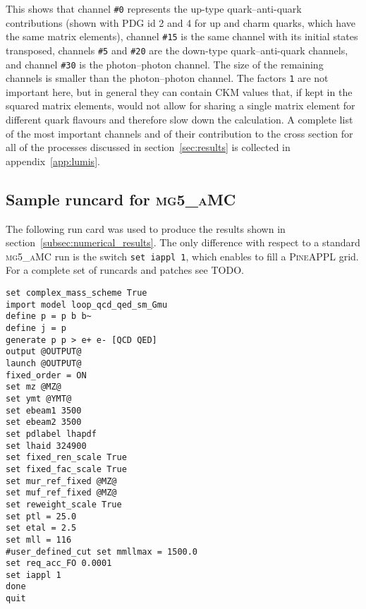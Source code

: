 This shows that channel \texttt{\#0} represents the up-type quark--anti-quark contributions (shown with PDG id 2 and 4 for up and charm quarks, which have the same matrix elements), channel \texttt{\#15} is the same channel with its initial states transposed, channels \texttt{\#5} and \texttt{\#20} are the down-type quark--anti-quark channels, and channel \texttt{\#30} is the photon--photon channel.
The size of the remaining channels is smaller than the photon--photon channel.
The factors \texttt{1} are not important here, but in general they can contain CKM values that, if kept in the squared matrix elements, would not allow for sharing a single matrix element for different quark flavours and therefore slow down the calculation. A complete list of the most important channels and of their
contribution to the cross section for all of the processes discussed in
section~\ref{sec:results} is collected in appendix~\ref{app:lumis}.

\subsection{Sample runcard for \texorpdfstring{\textsc{mg5\_aMC}}{mg5\_aMC}}
\label{app:sample-runcard}

The following run card was used to produce the results shown in section~\ref{subsec:numerical_results}.
The only difference with respect to a standard \textsc{mg5\_aMC} run is the switch \texttt{set iappl 1}, which enables to fill a \textsc{PineAPPL} grid.
For a complete set of runcards and patches see TODO.
\begin{verbatim}
set complex_mass_scheme True
import model loop_qcd_qed_sm_Gmu
define p = p b b~
define j = p
generate p p > e+ e- [QCD QED]
output @OUTPUT@
launch @OUTPUT@
fixed_order = ON
set mz @MZ@
set ymt @YMT@
set ebeam1 3500
set ebeam2 3500
set pdlabel lhapdf
set lhaid 324900
set fixed_ren_scale True
set fixed_fac_scale True
set mur_ref_fixed @MZ@
set muf_ref_fixed @MZ@
set reweight_scale True
set ptl = 25.0
set etal = 2.5
set mll = 116
#user_defined_cut set mmllmax = 1500.0
set req_acc_FO 0.0001
set iappl 1
done
quit
\end{verbatim}
